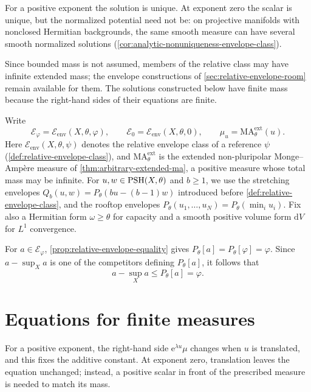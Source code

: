 For a positive exponent the solution is unique. At exponent zero the scalar is unique, but the normalized potential need not be: on projective manifolds with nonclosed Hermitian backgrounds, the same smooth measure can have several smooth normalized solutions (\cref{cor:analytic-nonuniqueness-envelope-class}).

Since bounded mass is not assumed, members of the relative class may have infinite extended mass; the envelope constructions of \cref{sec:relative-envelope-room} remain available for them. The solutions constructed below have finite mass because the right-hand sides of their equations are finite.

Write
\[
 \mathcal E_\varphi=\mathcal E_{\mathrm{env}}(X,\theta,\varphi),
 \qquad \mathcal E_0=\mathcal E_{\mathrm{env}}(X,\theta,0),
 \qquad \mu_u=\mathrm{MA}^{\mathrm{ext}}_\theta(u).
\]
Here $\mathcal E_{\mathrm{env}}(X,\theta,\psi)$ denotes the relative envelope class of a reference $\psi$ (\cref{def:relative-envelope-class}), and $\mathrm{MA}^{\mathrm{ext}}_\theta$ is the extended non-pluripolar Monge--Amp\`ere measure of \cref{thm:arbitrary-extended-ma}, a positive measure whose total mass may be infinite. For $u,w\in\mathrm{PSH}(X,\theta)$ and $b\geq1$, we use the stretching envelopes $Q_b(u,w)=P_\theta(bu-(b-1)w)$ introduced before \cref{def:relative-envelope-class}, and the rooftop envelopes $P_\theta(u_1,\ldots,u_N)=P_\theta(\min_iu_i)$. Fix also a Hermitian form $\omega\geq\theta$ for capacity and a smooth positive volume form $\mathrm{d}V$ for $L^1$ convergence.

For $a\in\mathcal E_\varphi$, \cref{prop:relative-envelope-equality} gives $P_\theta[a]=P_\theta[\varphi]=\varphi$. Since $a-\sup_Xa$ is one of the competitors defining $P_\theta[a]$, it follows that
\begin{equation}\label{eq:relative-normalized-model-bound}
 a-\sup_Xa\leq P_\theta[a]=\varphi.
\end{equation}

\clearpage
\section{Equations for finite measures}
\label{sec:relative-general-setting}

For a positive exponent, the right-hand side $\mathrm{e}^{\lambda u}\mu$ changes when $u$ is translated, and this fixes the additive constant. At exponent zero, translation leaves the equation unchanged; instead, a positive scalar in front of the prescribed measure is needed to match its mass.

